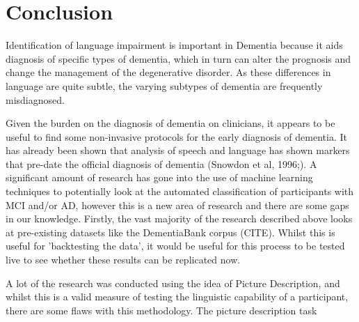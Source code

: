 \documentclass[a4paper]{article}
\begin{document}
\section{Conclusion}
\par
Identification of language impairment is important in Dementia because it aids diagnosis of specific types of dementia, which in turn can alter the prognosis and change the management of the degenerative disorder. As these differences in language are quite subtle, the varying subtypes of dementia are frequently misdiagnosed.
\newline
\par 
Given the burden on the diagnosis of dementia on clinicians, it appears to be useful to find some non-invasive protocols for the early diagnosis of dementia. It has already been shown that analysis of speech and language has shown markers that pre-date the official diagnosis of dementia (Snowdon et al, 1996;)\cite{Berisha2015}. A significant amount of research has gone into the use of machine learning techniques to potentially look at the automated classification of participants with MCI and/or AD, however this is a new area of research and there are some gaps in our knowledge. Firstly, the vast majority of the research described above looks at pre-existing datasets like the DementiaBank corpus (CITE). Whilst this is useful for 'backtesting the data', it would be useful for this process to be tested live to see whether these results can be replicated now. \newline 
\par
A lot of the research was conducted using the idea of Picture Description, and whilst this is a valid measure of testing the linguistic capability of a participant, there are some flaws with this methodology. The picture description task 


\end{document}
